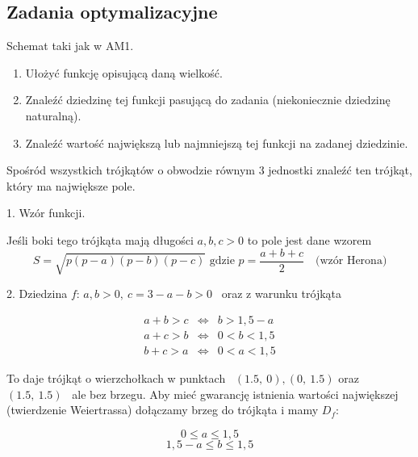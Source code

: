 \subsection{Zadania optymalizacyjne}

Schemat taki jak w AM1.
\begin{enumerate}
    \item Ułożyć funkcję opisującą daną wielkość.
    \item Znaleźć dziedzinę tej funkcji pasującą do zadania (niekoniecznie dziedzinę naturalną).
    \item Znaleźć wartość największą lub najmniejszą tej funkcji na zadanej dziedzinie.
\end{enumerate}
\bigskip

\begin{przykladbig}

Spośród wszystkich trójkątów o obwodzie równym $3$ jednostki znaleźć ten trójkąt, który ma największe pole.
\medskip

1. Wzór funkcji.

Jeśli boki tego trójkąta mają długości $a,b,c > 0$ to pole jest dane wzorem
\[ S = \sqrt{p(p-a)(p-b)(p-c)} \textrm{ \ gdzie \ } p = \frac{a+b+c}{2} \quad \textrm{(wzór Herona)} \]
\medskip

2. Dziedzina $f$: $ a,b > 0, \ c = 3 - a - b > 0 $ \ oraz z warunku trójkąta

\[ \begin{array}{ccc} 
    a+b>c & \Leftrightarrow & b > 1,5 - a \\
    a+c>b & \Leftrightarrow & 0 < b < 1,5 \\
    b+c>a & \Leftrightarrow & 0 < a < 1,5
\end{array} \]

To daje trójkąt o wierzchołkach w punktach \ $(1.5, \ 0), (0, \ 1.5)$ oraz $(1.5, \ 1.5)$ \ ale bez brzegu.
Aby mieć gwarancję istnienia wartości największej (twierdzenie Weiertrassa) dołączamy brzeg do trójkąta i mamy $D_f$:

\[ 0 \leq a \leq 1,5 \]
\[ 1,5 - a \leq b \leq 1,5 \]


\end{przykladbig}
